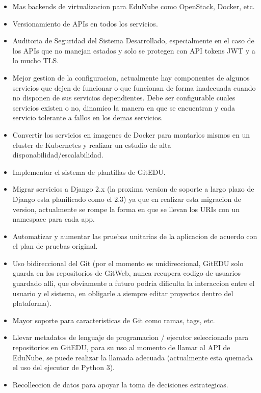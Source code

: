 \begin{itemize}
    \item Mas backends de virtualizacion para EduNube como OpenStack, Docker, etc.
    \item Versionamiento de APIs en todos los servicios.
    \item Auditoria de Seguridad del Sistema Desarrollado, especialmente en el caso de los APIs que no manejan estados y solo se protegen con API tokens JWT y a lo mucho TLS.
    \item Mejor gestion de la configuracion, actualmente hay componentes de algunos servicios que dejen de funcionar o que funcionan de forma inadecuada cuando no disponen de sus servicios dependientes. Debe ser configurable cuales servicios existen o no, dinamico la manera en que se encuentran y cada servicio tolerante a fallos en los demas servicios.
    \item Convertir los servicios en imagenes de Docker para montarlos mismos en un cluster de Kubernetes y realizar un estudio de alta disponabilidad/escalabilidad.
    \item Implementar el sistema de plantillas de GitEDU.
    \item Migrar servicios a Django 2.x (la proxima version de soporte a largo plazo de Django esta planificado como el 2.3) ya que en realizar esta migracion de version, actualmente se rompe la forma en que se llevan los URIs con un namespace para cada app.
    \item Automatizar y aumentar las pruebas unitarias de la aplicacion de acuerdo con el plan de pruebas original.
    \item Uso bidireccional del Git (por el momento es unidireccional, GitEDU solo guarda en los repositorios de GitWeb, nunca recupera codigo de usuarios guardado alli, que obviamente a futuro podria dificulta la interaccion entre el usuario y el sistema, en obligarle a siempre editar proyectos dentro del plataforma).
    \item Mayor soporte para caracteristicas de Git como ramas, tags, etc.
    \item Llevar metadatos de lenguaje de programacion / ejecutor seleccionado para repositorios en GitEDU, para su uso al momento de llamar al API de EduNube, se puede realizar la llamada adecuada (actualmente esta quemada el uso del ejecutor de Python 3).
    \item Recolleccion de datos para apoyar la toma de decisiones estrategicas.
\end{itemize}
